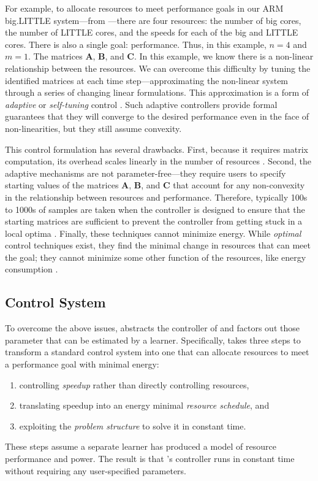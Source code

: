 For example, to allocate resources to meet performance goals in our
ARM big.LITTLE system---from ---there are four
resources: the number of big cores, the number of LITTLE cores, and
the speeds for each of the big and LITTLE cores.  There is also a
single goal: performance.  Thus, in this example, $n=4$ and $m=1$.
The matrices $\mathbf{A}$, $\mathbf{B}$, and $\mathbf{C}$.  In this
example, we know there is a non-linear relationship between the
resources.  We can overcome this difficulty by tuning the identified
matrices at each time step---approximating the non-linear system
through a series of changing linear formulations.  This approximation
is a form of \emph{adaptive} or \emph{self-tuning} control
\cite{AdaptiveControl}.  Such adaptive controllers provide formal
guarantees that they will converge to the desired performance even in
the face of non-linearities, but they still assume convexity.

This control formulation has several drawbacks.  First, because it
requires matrix computation, its overhead scales linearly in the
number of resources \cite{Hellerstein2004a,METE}.  Second, the
adaptive mechanisms are not parameter-free---they require users to
specify starting values of the matrices $\mathbf{A}$, $\mathbf{B}$,
and $\mathbf{C}$ that account for any non-convexity in the
relationship between resources and
performance\cite{POET,METE,ControlWare,AdaptiveControl}.  Therefore,
typically 100s to 1000s of samples are taken when the controller is
designed to ensure that the starting matrices are sufficient to
prevent the controller from getting stuck in a local optima
\cite{FSE2015,sysid}.  Finally, these techniques cannot minimize
energy.  While \emph{optimal} control techniques exist, they find the
minimal change in resources that can meet the goal; \ie{} they cannot
minimize some other function of the resources, like energy consumption
\cite{josep-isca2016,Hellerstein2004a,optimal-control}.

\subsection{\SYSTEM{} Control System}
To overcome the above issues, \SYSTEM{} abstracts the controller of
 and factors out those parameter that can be
estimated by a learner.  Specifically, \SYSTEM{} takes three steps to
transform a standard control system into one that can allocate
resources to meet a performance goal with minimal energy: 
\begin{enumerate}
\item controlling \emph{speedup} rather than directly controlling
  resources,
\item translating speedup into an energy
  minimal \emph{resource schedule}, and  
\item exploiting the \emph{problem structure} to solve it in constant
  time.  
\end{enumerate}
These steps assume a separate learner has produced a model of resource
performance and power.  The result is that \SYSTEM{}'s controller runs
in constant time without requiring any user-specified parameters.


